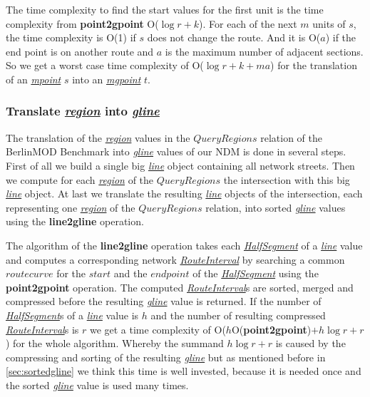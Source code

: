 \documentclass[a4paper]{article}
\newcommand{\bmodb} {BerlinMOD Benchmark}
\newcommand{\op}[1]{\textbf{#1}}
\newcommand{\dt}[1]{\textsl{\underline{#1}}}
\begin{document}
{The time complexity to find the start values for the first unit is the time complexity
from \op{point2gpoint} O($\log r + k$).
For each of the next $m$ units of $s$, the time complexity is O(1) if $s$ does not
change the route. And it is O($a$) if the end point is on another route and $a$ is the maximum
number of adjacent sections. So we get a worst case time complexity of
O($\log r + k + ma$) for the translation of an \dt{mpoint} $s$ into an \dt{mgpoint} $t$.
\subsubsection{Translate \dt{region} into \dt{gline}}
The translation of the \dt{region} values in the $QueryRegions$ relation of the
\bmodb{} into \dt{gline} values of our NDM is done in several steps.
First of all we build a single big \dt{line} object containing all network streets.
Then we compute for each \dt{region} of the $QueryRegions$ the intersection with
this big \dt{line} object. At last we translate the resulting \dt{line} objects
of the intersection, each representing one \dt{region} of the $QueryRegions$
relation, into sorted \dt{gline} values using the \op{line2gline} operation.

The algorithm of the \op{line2gline} operation takes each \dt{HalfSegment} of a
\dt{line} value and computes a corresponding network \dt{RouteInterval} by
searching a common $route curve$ for the $start$ and the $end point$ of the
\dt{HalfSegment} using the \op{point2gpoint} operation. The computed
\dt{RouteInterval}s are sorted, merged and compressed before the resulting
\dt{gline} value is returned. If the number of \dt{HalfSegment}s of a \dt{line}
value is $h$ and the number of resulting compressed \dt{RouteInterval}s is $r$
we get a time complexity of O($h$O(\op{point2gpoint})$+ h \log r + r$) for the
whole algorithm. Whereby the summand $h \log r + r$ is caused by the compressing
and sorting of the resulting \dt{gline} but as mentioned before
in \ref{sec:sortedgline} we think this time is well invested, because it is needed
once and the sorted \dt{gline} value is used many times.
}
\end{document}
